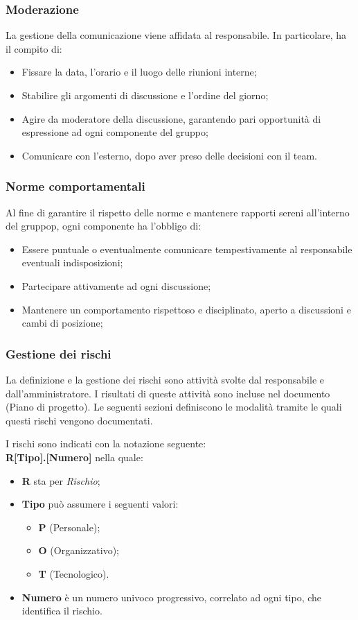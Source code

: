 \documentclass[10pt, a4paper]{article}
\begin{document}
\subsubsection{Moderazione}
La gestione della comunicazione viene affidata al responsabile. In particolare, ha il compito di:
\begin{itemize}
    \item Fissare la data, l'orario e il luogo delle riunioni interne;
    \item Stabilire gli argomenti di discussione e l'ordine del giorno;
    \item Agire da moderatore della discussione, garantendo pari opportunità di espressione ad ogni componente del gruppo;
    \item Comunicare con l'esterno, dopo aver preso delle decisioni con il team. 
\end{itemize}

\subsubsection{Norme comportamentali}
Al fine di garantire il rispetto delle norme e mantenere rapporti sereni all'interno del gruppop, ogni componente ha l'obbligo di:
\begin{itemize}
    \item Essere puntuale o eventualmente comunicare tempestivamente al responsabile eventuali indisposizioni;
    \item Partecipare attivamente ad ogni discussione;
    \item Mantenere un comportamento rispettoso e disciplinato, aperto a discussioni e cambi di posizione;
\end{itemize}

\subsubsection{Gestione dei rischi}
La definizione e la gestione dei rischi sono attività svolte dal responsabile e dall'amministratore.
I risultati di queste attività sono incluse nel documento (Piano di progetto).
Le seguenti sezioni definiscono le modalità tramite le quali questi rischi vengono documentati.

I rischi sono indicati con la notazione seguente:\\
\textbf{R[Tipo].[Numero]}
nella quale:
\begin{itemize}
\item \textbf{R} sta per \textit{Rischio};
\item \textbf{Tipo} può assumere i seguenti valori:
    \begin{itemize}
	\item \textbf{P} (Personale);
	\item \textbf{O} (Organizzativo);
	\item \textbf{T} (Tecnologico).
    \end{itemize}
\item \textbf{Numero} è un numero univoco progressivo, correlato ad ogni tipo, che identifica il rischio.
\end{itemize}
\end{document}
